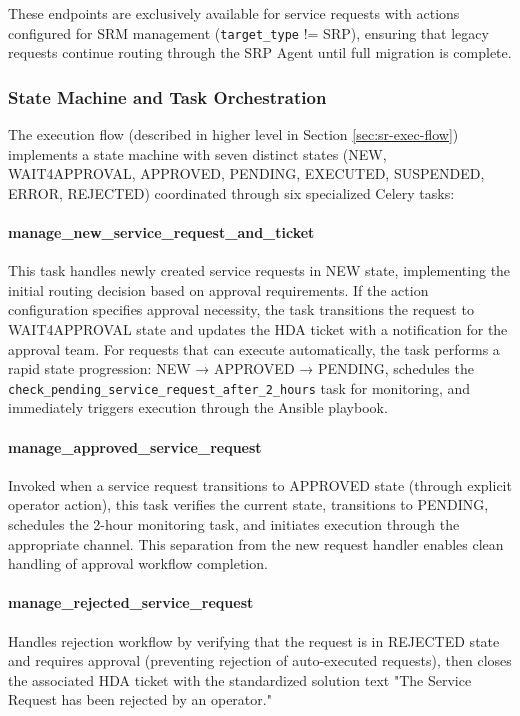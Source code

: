 These endpoints are exclusively available for service requests with actions configured for SRM management (\texttt{target\_type} != SRP), ensuring that legacy requests continue routing through the SRP Agent until full migration is complete.

\subsubsection{State Machine and Task Orchestration}

The execution flow (described in higher level in Section \ref{sec:sr-exec-flow}) implements a state machine with seven distinct states (NEW, WAIT4APPROVAL, APPROVED, PENDING, EXECUTED, SUSPENDED, ERROR, REJECTED) coordinated through six specialized Celery tasks:

\paragraph{manage\_new\_service\_request\_and\_ticket}
This task handles newly created service requests in NEW state, implementing the initial routing decision based on approval requirements. If the action configuration specifies approval necessity, the task transitions the request to WAIT4APPROVAL state and updates the HDA ticket with a notification for the approval team. For requests that can execute automatically, the task performs a rapid state progression: NEW → APPROVED → PENDING, schedules the \texttt{check\_pending\_service\_request\_after\_2\_hours} task for monitoring, and immediately triggers execution through the Ansible playbook.

\paragraph{manage\_approved\_service\_request}
Invoked when a service request transitions to APPROVED state (through explicit operator action), this task verifies the current state, transitions to PENDING, schedules the 2-hour monitoring task, and initiates execution through the appropriate channel. This separation from the new request handler enables clean handling of approval workflow completion.

\paragraph{manage\_rejected\_service\_request}
Handles rejection workflow by verifying that the request is in REJECTED state and requires approval (preventing rejection of auto-executed requests), then closes the associated HDA ticket with the standardized solution text "The Service Request has been rejected by an operator."

